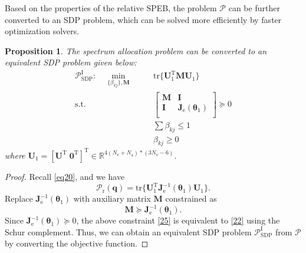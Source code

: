 \documentclass{IEEEtran}
\newtheorem{proposition}{Proposition}
\begin{document}
Based on the properties of the relative SPEB, the problem $\mathscr{P}$ can be further converted to an SDP problem, which can be solved more efficiently by faster optimization solvers.
\begin{proposition}\label{p2}
The spectrum allocation problem can be converted to an equivalent SDP problem given below:
\begin{eqnarray}\label{26}
\mathscr{P}_{\text{SDP}}^{\text{I}}: \quad \min_{\{\beta_{kj}\},\mathbf{M}} \quad &&\text{tr}\{\mathbf{U}_1^{\text{T}}\mathbf{M}\mathbf{U}_1\} \nonumber\\
\text{s.t.} \quad &&\begin{bmatrix}
  \mathbf{M}&\mathbf{I}\\
  \mathbf{I}&\mathbf{J}_{\text{e}}(\boldsymbol{\theta}_1) \\
\end{bmatrix}\succeq 0 \label{22}\\
&&\sum \beta_{kj}\leq 1 \nonumber\\
&&\beta_{kj}\geq 0\nonumber
\end{eqnarray}
where $\mathbf{U}_1=[\mathbf{U}^{\text{T}}\; \mathbf{0}^{\text{T}}]^{\text{T}} \in \mathbb{R}^{4(N_{\text{v}}+N_{\text{a}})*(3N_{\text{v}}-6)}$.
\end{proposition}

\begin{proof} Recall \eqref{eq20}, and we have
\begin{equation*}
\mathcal{P}_{\text{r}}(\mathbf{q})=\text{tr}\{\mathbf{U}_1^{\text{T}}\mathbf{J}_{\text{e}}^{-1}(\boldsymbol{\theta}_1)\mathbf{U}_1 \}.
\end{equation*}
Replace $\mathbf{J}_{\text{e}}^{-1}(\boldsymbol{\theta}_1)$ with auxiliary matrix $\mathbf{M}$ constrained as
\begin{equation}\label{25}
\mathbf{M}\succeq \mathbf{J}_{\text{e}}^{-1}(\boldsymbol{\theta}_1).
\end{equation}
Since $\mathbf{J}_{\text{e}}^{-1}(\boldsymbol{\theta}_1) \succeq 0$, the above constraint \eqref{25} is equivalent to \eqref{22} using the Schur complement. Thus, we can obtain an equivalent SDP problem $\mathscr{P}_{\text{SDP}}^{\text{I}}$ from $\mathscr{P}$ by converting the objective function.
\end{proof}
\end{document}
